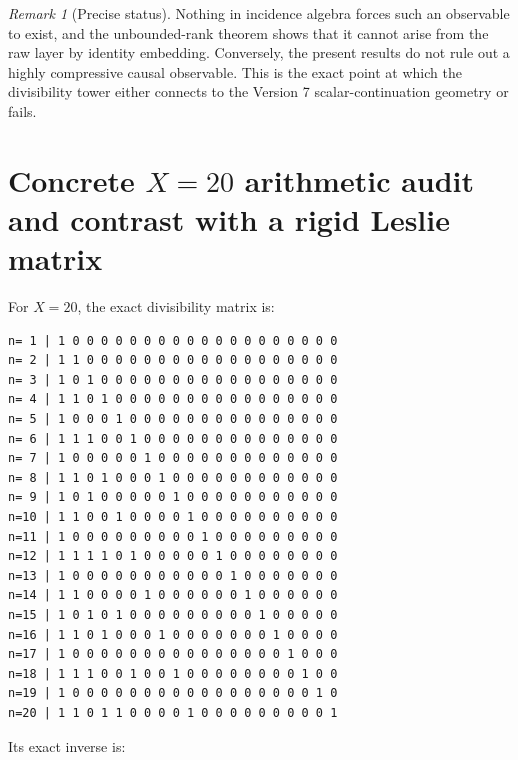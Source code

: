 \documentclass[11pt]{amsart}
\numberwithin{equation}{section}
\theoremstyle{plain}
\theoremstyle{definition}
\theoremstyle{remark}
\newtheorem{remark}[theorem]{Remark}
\begin{document}
\begin{remark}[Precise status]
\label{rem:v9_projection_status}
Nothing in incidence algebra forces such an observable to exist, and the unbounded-rank theorem
shows that it cannot arise from the raw layer by identity embedding.  Conversely, the present
results do not rule out a highly compressive causal observable.  This is the exact point at which
the divisibility tower either connects to the Version 7 scalar-continuation geometry or fails.
\end{remark}

\section{Concrete $X=20$ arithmetic audit and contrast with a rigid Leslie matrix}
\label{sec:X20_contrast}

For $X=20$, the exact divisibility matrix is:

\begingroup
\scriptsize
\begin{verbatim}
n= 1 | 1 0 0 0 0 0 0 0 0 0 0 0 0 0 0 0 0 0 0 0
n= 2 | 1 1 0 0 0 0 0 0 0 0 0 0 0 0 0 0 0 0 0 0
n= 3 | 1 0 1 0 0 0 0 0 0 0 0 0 0 0 0 0 0 0 0 0
n= 4 | 1 1 0 1 0 0 0 0 0 0 0 0 0 0 0 0 0 0 0 0
n= 5 | 1 0 0 0 1 0 0 0 0 0 0 0 0 0 0 0 0 0 0 0
n= 6 | 1 1 1 0 0 1 0 0 0 0 0 0 0 0 0 0 0 0 0 0
n= 7 | 1 0 0 0 0 0 1 0 0 0 0 0 0 0 0 0 0 0 0 0
n= 8 | 1 1 0 1 0 0 0 1 0 0 0 0 0 0 0 0 0 0 0 0
n= 9 | 1 0 1 0 0 0 0 0 1 0 0 0 0 0 0 0 0 0 0 0
n=10 | 1 1 0 0 1 0 0 0 0 1 0 0 0 0 0 0 0 0 0 0
n=11 | 1 0 0 0 0 0 0 0 0 0 1 0 0 0 0 0 0 0 0 0
n=12 | 1 1 1 1 0 1 0 0 0 0 0 1 0 0 0 0 0 0 0 0
n=13 | 1 0 0 0 0 0 0 0 0 0 0 0 1 0 0 0 0 0 0 0
n=14 | 1 1 0 0 0 0 1 0 0 0 0 0 0 1 0 0 0 0 0 0
n=15 | 1 0 1 0 1 0 0 0 0 0 0 0 0 0 1 0 0 0 0 0
n=16 | 1 1 0 1 0 0 0 1 0 0 0 0 0 0 0 1 0 0 0 0
n=17 | 1 0 0 0 0 0 0 0 0 0 0 0 0 0 0 0 1 0 0 0
n=18 | 1 1 1 0 0 1 0 0 1 0 0 0 0 0 0 0 0 1 0 0
n=19 | 1 0 0 0 0 0 0 0 0 0 0 0 0 0 0 0 0 0 1 0
n=20 | 1 1 0 1 1 0 0 0 0 1 0 0 0 0 0 0 0 0 0 1
\end{verbatim}
\endgroup

Its exact inverse is:
\end{document}
